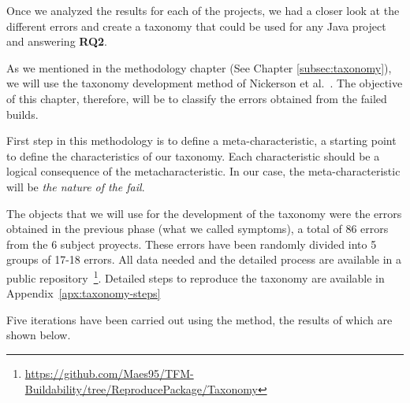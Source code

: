 Once we analyzed the results for each of the projects, we had a closer look at the different errors and create a taxonomy that could be used for any Java project and answering \textbf{RQ2}.

As we mentioned in the methodology chapter (See Chapter \ref{subsec:taxonomy}), we will use the taxonomy development method of Nickerson et al.~\cite{Nickerson2013}. The objective of this chapter, therefore, will be to classify the errors obtained from the failed builds.

First step in this methodology is to define a meta-characteristic, a starting point to define the characteristics of our taxonomy. Each characteristic should be a logical consequence of the metacharacteristic. In our case, the meta-characteristic will be \textit{the nature of the fail}. 

The objects that we will use for the development of the taxonomy were the errors obtained in the previous phase (what we called symptoms), a total of 86 errors from the 6 subject proyects. These errors have been randomly divided into 5 groups of 17-18 errors. All data needed and the detailed process are available in a public repository~\footnote{\url{https://github.com/Maes95/TFM-Buildability/tree/ReproducePackage/Taxonomy}}. Detailed steps to reproduce the taxonomy are available in Appendix~\ref{apx:taxonomy-steps}

Five iterations have been carried out using the method, the results of which are shown below. 

